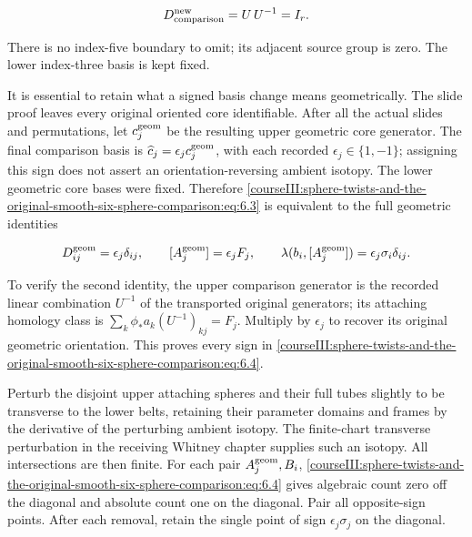 \begin{equation}
D_{\rm comparison}^{\rm new}=U\,U^{-1}=I_r .
 \label{courseIII:sphere-twists-and-the-original-smooth-six-sphere-comparison:eq:6.3}
\end{equation}

There is no index-five boundary to omit; its adjacent source group is zero. The lower index-three basis is kept fixed.

It is essential to retain what a signed basis change means geometrically. The slide proof leaves every original oriented core identifiable. After all the actual slides and permutations, let \(c_j^{\rm geom}\) be the resulting upper geometric core generator. The final comparison basis is \(\widehat c_j=\epsilon_j c_j^{\rm geom}\), with each recorded \(\epsilon_j\in\{1,-1\}\); assigning this sign does not assert an orientation-reversing ambient isotopy. The lower geometric core bases were fixed. Therefore \eqref{courseIII:sphere-twists-and-the-original-smooth-six-sphere-comparison:eq:6.3} is equivalent to the full geometric identities

\begin{equation}
D^{\rm geom}_{ij}=\epsilon_j\delta_{ij},\qquad
 [A_j^{\rm geom}]=\epsilon_jF_j,\qquad
       \lambda(b_i,[A_j^{\rm geom}])
                             =\epsilon_j\sigma_i\delta_{ij}.
 \label{courseIII:sphere-twists-and-the-original-smooth-six-sphere-comparison:eq:6.4}
\end{equation}

To verify the second identity, the upper comparison generator is the recorded linear combination \(U^{-1}\) of the transported original generators; its attaching homology class is \(\sum_k\phi_*a_k(U^{-1})_{kj}=F_j\). Multiply by \(\epsilon_j\) to recover its original geometric orientation. This proves every sign in \eqref{courseIII:sphere-twists-and-the-original-smooth-six-sphere-comparison:eq:6.4}.

Perturb the disjoint upper attaching spheres and their full tubes slightly to be transverse to the lower belts, retaining their parameter domains and frames by the derivative of the perturbing ambient isotopy. The finite-chart transverse perturbation in the receiving Whitney chapter supplies such an isotopy. All intersections are then finite. For each pair \(A_j^{\rm geom},B_i\), \eqref{courseIII:sphere-twists-and-the-original-smooth-six-sphere-comparison:eq:6.4} gives algebraic count zero off the diagonal and absolute count one on the diagonal. Pair all opposite-sign points. After each removal, retain the single point of sign \(\epsilon_j\sigma_j\) on the diagonal.

